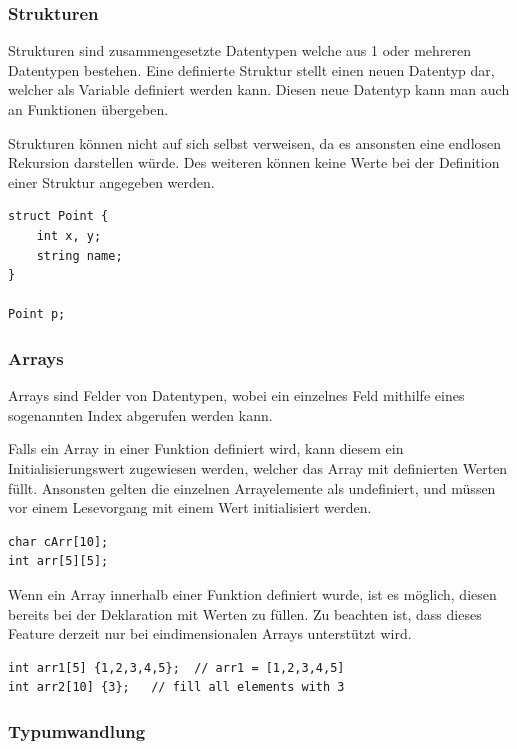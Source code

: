 \subsubsection{Strukturen}

Strukturen sind zusammengesetzte Datentypen welche aus 1 oder mehreren Datentypen bestehen. Eine definierte Struktur stellt einen neuen Datentyp dar, welcher als Variable definiert werden kann. Diesen neue Datentyp kann man auch an Funktionen \"ubergeben.

Strukturen k\"onnen nicht auf sich selbst verweisen, da es ansonsten eine endlosen Rekursion darstellen w\"urde. Des weiteren k\"onnen keine Werte bei der Definition einer Struktur angegeben werden.

\begin{lstlisting}[language=CMM]
struct Point {
    int x, y;
    string name;
}

Point p;
\end{lstlisting}

\subsubsection{Arrays}

Arrays sind Felder von Datentypen, wobei ein einzelnes Feld mithilfe eines sogenannten Index abgerufen werden kann.

Falls ein Array in einer Funktion definiert wird, kann diesem ein Initialisierungswert zugewiesen werden, welcher das Array mit definierten Werten f\"ullt. Ansonsten gelten die einzelnen Arrayelemente als undefiniert, und m\"ussen vor einem Lesevorgang mit einem Wert initialisiert werden.

\begin{lstlisting}[language=CMM]
char cArr[10];
int arr[5][5];
\end{lstlisting}


Wenn ein Array innerhalb einer Funktion definiert wurde, ist es m\"oglich, diesen bereits bei der Deklaration mit Werten zu f\"ullen. Zu beachten ist, dass dieses Feature derzeit nur bei eindimensionalen Arrays unterst\"utzt wird.

\begin{lstlisting}[language=CMM]
int arr1[5] {1,2,3,4,5};  // arr1 = [1,2,3,4,5]
int arr2[10] {3};	// fill all elements with 3
\end{lstlisting}

\subsubsection{Typumwandlung}

